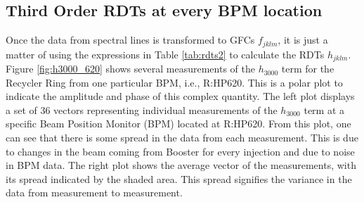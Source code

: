 
\subsection{Third Order RDTs at every BPM location}

Once the data from spectral lines is transformed to GFCs $f_{jklm}$, it is just a matter of using the expressions in Table \ref{tab:rdts2} to calculate the RDTs $h_{jklm}$. Figure \ref{fig:h3000_620} shows several measurements of the $h_{3000}$ term for the Recycler Ring from one particular BPM, i.e., R:HP620. This is a polar plot to indicate the amplitude and phase of this complex quantity. The left plot displays a set of 36 vectors representing individual measurements of the $h_{3000}$ term at a specific Beam Position Monitor (BPM) located at R:HP620. From this plot, one can see that there is some spread in the data from each measurement. This is due to changes in the beam coming from Booster for every injection and due to noise in BPM data. The right plot shows the average vector of the measurements, with its spread indicated by the shaded area. This spread signifies the variance in the data from measurement to measurement. 

